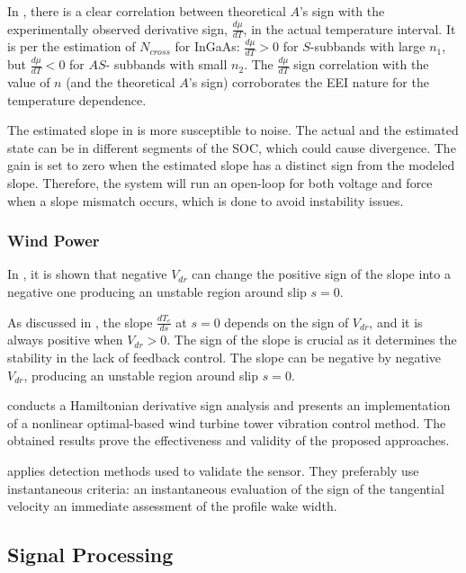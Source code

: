 \documentclass[11pt]{book}
\begin{document}
In \cite{gudina2019effect}, there is a clear correlation between
theoretical $A$'s sign with the experimentally observed derivative
sign, $\frac{d\mu}{dT}$, in the actual temperature interval. It is
per the estimation of $N_{cross}$ for InGaAs: $\frac{d\mu}{dT}>0$
for $S$-subbands with large $n_{1}$, but $\frac{d\mu}{dT}<0$ for
$AS$- subbands with small $n_{2}$. The $\frac{d\mu}{dT}$ sign correlation
with the value of $n$ (and the theoretical $A$'s sign) corroborates
the EEI nature for the temperature dependence.

The estimated slope in \cite{figueroa2020leveraging} is more susceptible
to noise. The actual and the estimated state can be in different segments
of the SOC, which could cause divergence. The gain is set to zero
when the estimated slope has a distinct sign from the modeled slope.
Therefore, the system will run an open-loop for both voltage and force
when a slope mismatch occurs, which is done to avoid instability issues.


\subsubsection{Wind Power}

In \cite{nagy2013control}, it is shown that negative $V_{dr}$ can
change the positive sign of the slope into a negative one producing
an unstable region around slip $s=0$.

As discussed in \cite{stumpf2013study}, the slope $\frac{dT_{e}}{ds}$
at $s=0$ depends on the sign of $V_{dr}$, and it is always positive
when $V_{dr}>0$. The sign of the slope is crucial as it determines
the stability in the lack of feedback control. The slope can be negative
by negative $V_{dr}$, producing an unstable region around slip $s=0$.

\cite{martynowicz2021nonlinear} conducts a Hamiltonian derivative
sign analysis and presents an implementation of a nonlinear optimal-based wind turbine tower vibration control method. The obtained results prove the effectiveness and validity of the proposed approaches.

\cite{soulier2021low} applies detection methods used to validate
the sensor. They preferably use instantaneous criteria: an instantaneous
evaluation of the sign of the tangential velocity an immediate assessment
of the profile wake width.


\subsection{Signal Processing}
\end{document}
